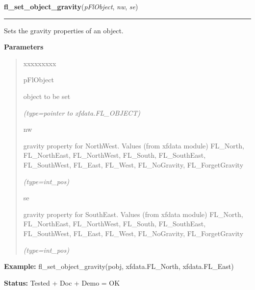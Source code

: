\hspace{.8\funcindent}\begin{boxedminipage}{\funcwidth}

    \raggedright \textbf{fl\_set\_object\_gravity}(\textit{pFlObject}, \textit{nw}, \textit{se})

    \vspace{-1.5ex}

    \rule{\textwidth}{0.5\fboxrule}
\setlength{\parskip}{2ex}
    Sets the gravity properties of an object.

\setlength{\parskip}{1ex}
      \textbf{Parameters}
      \vspace{-1ex}

      \begin{quote}
        \begin{Ventry}{xxxxxxxxx}

          \item[pFlObject]

          object to be set

            {\it (type=pointer to xfdata.FL\_OBJECT)}

          \item[nw]

          gravity property for NorthWest. Values (from xfdata module) 
          FL\_North, FL\_NorthEast, FL\_NorthWest, FL\_South, 
          FL\_SouthEast, FL\_SouthWest, FL\_East, FL\_West, FL\_NoGravity, 
          FL\_ForgetGravity

            {\it (type=int\_pos)}

          \item[se]

          gravity property for SouthEast. Values (from xfdata module) 
          FL\_North, FL\_NorthEast, FL\_NorthWest, FL\_South, 
          FL\_SouthEast, FL\_SouthWest, FL\_East, FL\_West, FL\_NoGravity, 
          FL\_ForgetGravity

            {\it (type=int\_pos)}

        \end{Ventry}

      \end{quote}

\textbf{Example:} fl\_set\_object\_gravity(pobj, xfdata.FL\_North, xfdata.FL\_East)



\textbf{Status:} Tested + Doc + Demo = OK



    \end{boxedminipage}

